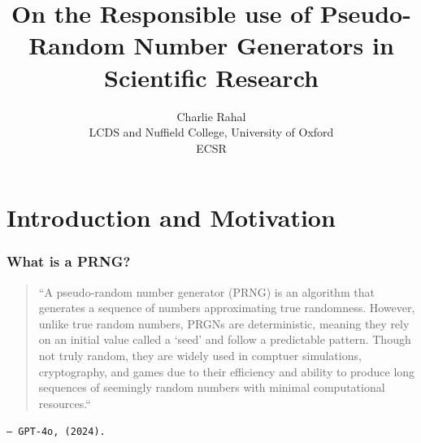 \documentclass[12pt]{beamer}
\begin{document}
\section{Introduction and Motivation}

\title{On the Responsible use of Pseudo-Random Number Generators in Scientific Research} \vspace{-0.25in}
\author{\footnotesize{Charlie Rahal\\ \vspace{0.05in} LCDS and Nuffield College, University of Oxford\\\vspace{.1in}ECSR}\\ \vspace{-0.15in}}
 \date{}


\begin{frame}
\frametitle{What is a PRNG?}
\begin{center}
\begin{quote}
\begin{scriptsize}
``A pseudo-random number generator (PRNG) is an algorithm that generates a sequence of numbers approximating true randomness. However, unlike true random numbers, PRGNs are deterministic, meaning they rely on an initial value called a `seed' and follow a predictable pattern. Though not truly random, they are widely used in comptuer simulations, cryptography, and games due to their efficiency and ability to produce long sequences of seemingly random numbers with minimal computational resources.``
\end{scriptsize}
\vspace{.4in}
\end{quote}
\begin{small}
\quad \quad \quad \quad \quad \quad \quad \quad \quad \quad \texttt{-- GPT-4o, (2024).}
\end{small}
\end{center}
\end{frame}
\end{document}

